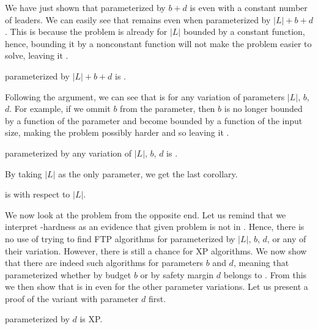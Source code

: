 We have just shown that \HL parameterized by $b+d$ is \Wh even with a constant number of leaders.
We can easily see that \HLshort remains \Wh even when parameterized by $|L|+b+d$.
This is because the problem is \Wh already for $|L|$ bounded by a constant function,
hence, bounding it by a nonconstant function will not make the problem easier to solve, leaving it \Wh.

\begin{corollary}
    \HL parameterized by $|L|+b+d$ is \Wh.
\end{corollary}

Following the argument, we can see that \HL is \Wh for any variation of parameters $|L|$, $b$, $d$.
For example, if we ommit $b$ from the parameter, then $b$ is no longer bounded by a function of the parameter and
become bounded by a function of the input size, making the problem possibly harder and so leaving it \Wh.

\begin{corollary}
    \HL parameterized by any variation of $|L|$, $b$, $d$ is \Wh.
\end{corollary}

By taking $|L|$ as the only parameter, we get the last corollary.

\begin{corollary}
    \HL is \pNPh with respect to $|L|$.
\end{corollary}


We now look at the problem from the opposite end.
Let us remind that we interpret \W-hardness as an evidence that given problem is not in \FPT.
Hence, there is no use of trying to find FTP algorithms for \HL parameterized by $|L|$, $b$, $d$, or any of their variation.
However, there is still a chance for XP algorithms.
We now show that there are indeed such algorithms for parameters $b$ and $d$, meaning that
\HL parameterized whether by budget $b$ or by safety margin $d$ belongs to \XP.
From this we then show that \HLshort is in \XP even for the other parameter variations.
Let us present a proof of the variant with parameter $d$ first.

\begin{theorem}
    \HL parameterized by $d$ is XP.
\end{theorem}

